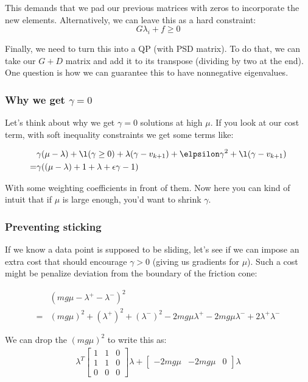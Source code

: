 \documentclass{article}
\begin{document}
This demands that we pad our previous matrices with zeros to incorporate the new elements. Alternatively, we can leave this as a hard constraint:
\[
    G \lambda_i + f \geq 0
\]

Finally, we need to turn this into a QP (with PSD matrix). To do that, we can take our $G + D$ matrix and add it to its transpose (dividing by two at the end). One question is how we can guarantee this to have nonnegative eigenvalues.

\subsubsection{Why we get $\gamma = 0$}

Let's think about why we get $\gamma = 0$ solutions at high $\mu$. If you look at our cost term, with soft inequality constraints we get some terms like:

\begin{align*}
    &\gamma (\mu - \lambda) + \l(\gamma \geq 0) + \lambda (\gamma - v_{k+1}) + \elpsilon \gamma^2 + \l (\gamma - v_{k+1}) \\
    = &\gamma( (\mu - \lambda) +1 + \lambda + \epsilon \gamma - 1)
\end{align*}

With some weighting coefficients in front of them. Now here you can kind of intuit that if $\mu$ is large enough, you'd want to shrink $\gamma$. 

\subsubsection{Preventing sticking}
If we know a data point is supposed to be sliding, let's see if we can impose an extra cost that should encourage $\gamma > 0$ (giving us gradients for $\mu$). Such a cost might be penalize deviation from the boundary of the friction cone:

\begin{align*}
      &(m g \mu - \lambda^+ - \lambda^-)^2 \\
    = & (m g \mu)^2 + (\lambda^+) ^2 + (\lambda^-) ^2 - 2 m g \mu \lambda^+ - 2 m g \mu \lambda^- + 2 \lambda^+ \lambda^-
\end{align*}

We can drop the $(m g \mu)^2$ to write this as:
\begin{align*}
    \lambda^T
    \begin{bmatrix}
        1 & 1 & 0 \\
        1 & 1 & 0 \\
        0 & 0 & 0
    \end{bmatrix}
    \lambda + 
    \begin{bmatrix}
        -2 m g \mu & -2 m g \mu & 0
    \end{bmatrix}
    \lambda
\end{align*}
\end{document}
